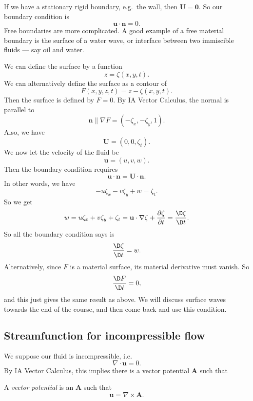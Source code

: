 \documentclass[a4paper]{article}
\begin{document}
If we have a stationary rigid boundary, e.g.\ the wall, then $\mathbf{U} = \mathbf{0}$. So our boundary condition is
\[
  \mathbf{u}\cdot \mathbf{n}= 0.
\]
Free boundaries are more complicated. A good example of a free material boundary is the surface of a water wave, or interface between two immiscible fluids --- say oil and water.
\begin{center}
\end{center}
We can define the surface by a function
\[
  z = \zeta(x, y, t).
\]
We can alternatively define the surface as a contour of
\[
  F(x, y, z, t) = z - \zeta(x, y, t).
\]
Then the surface is defined by $F = 0$. By IA Vector Calculus, the normal is parallel to
\[
  \mathbf{n} \parallel \nabla F = (-\zeta_x, -\zeta_y, 1).
\]
Also, we have
\[
  \mathbf{U} = (0, 0, \zeta_t).
\]
We now let the velocity of the fluid be
\[
  \mathbf{u} = (u, v, w).
\]
Then the boundary condition requires
\[
  \mathbf{u}\cdot \mathbf{n} = \mathbf{U}\cdot \mathbf{n}.
\]
In other words, we have
\[
  -u \zeta_x - v\zeta_y + w = \zeta_t.
\]
So we get
\[
  w = u \zeta_x + v\zeta_y + \zeta_t = \mathbf{u}\cdot \nabla \zeta + \frac{\partial \zeta}{\partial t} = \frac{\D \zeta}{\D t}.
\]
So all the boundary condition says is
\[
  \frac{\D \zeta}{\D t} = w.
\]
Alternatively, since $F$ is a material surface, its material derivative must vanish. So
\[
  \frac{\D F}{\D t} = 0,
\]
and this just gives the same result as above. We will discuss surface waves towards the end of the course, and then come back and use this condition.

\subsection{Streamfunction for incompressible flow}
We suppose our fluid is incompressible, i.e.
\[
  \nabla \cdot \mathbf{u} = 0.
\]
By IA Vector Calculus, this implies there is a vector potential $\mathbf{A}$ such that
\begin{defi}
  A \emph{vector potential} is an $\mathbf{A}$ such that
  \[
    \mathbf{u} = \nabla \times \mathbf{A}.
  \]
\end{defi}
\end{document}
